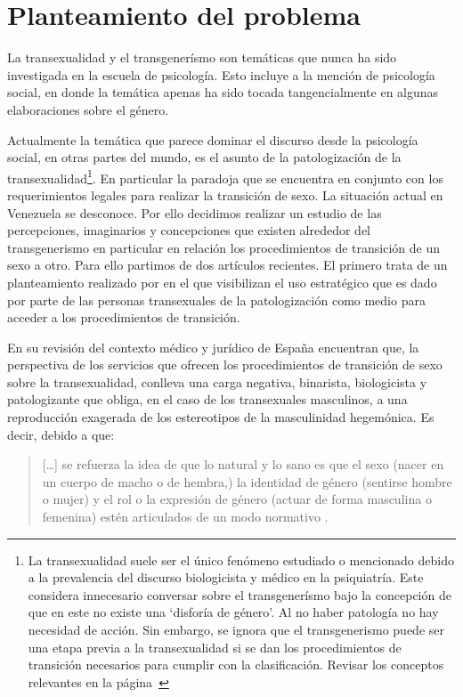 \section{Planteamiento del problema}

La transexualidad y el transgenerísmo son temáticas que nunca ha sido
investigada en la escuela de psicología. Esto incluye a la mención de psicología
social, en donde la temática apenas ha sido tocada tangencialmente en algunas
elaboraciones sobre el género.

Actualmente la temática que parece dominar el discurso desde la psicología
social, en otras partes del mundo, es el asunto de la patologización de la
transexualidad\footnote{La transexualidad suele ser el único fenómeno estudiado
o mencionado debido a la prevalencia del discurso biologicista y médico en la
psiquiatría. Este considera innecesario conversar sobre el transgenerísmo bajo
la concepción de que en este no existe una ‘disforía de género’. Al no haber
patología no hay necesidad de acción. Sin embargo, se ignora que el
transgenerismo puede ser una etapa previa a la transexualidad si se dan los
procedimientos de transición necesarios para cumplir con la clasificación.
Revisar los conceptos relevantes en la página~\pageref{diferencia}}. En
particular la paradoja que se encuentra en conjunto con los requerimientos
legales para realizar la transición de sexo. La situación actual en Venezuela se
desconoce. Por ello decidimos realizar un estudio de las percepciones,
imaginarios y concepciones que existen alrededor del transgenerismo en
particular en relación los procedimientos de transición de un sexo a otro.
Para ello partimos de dos artículos recientes. El primero trata de un
planteamiento realizado por \textcite{Coll-Planas2015} en el que visibilizan el
uso estratégico que es dado por parte de las personas transexuales de la
patologización como medio para acceder a los procedimientos de transición.

En su revisión del contexto médico y jurídico de España encuentran que, la
perspectiva de los servicios que ofrecen los procedimientos de transición de
sexo sobre la transexualidad, conlleva una carga negativa, binarista,
biologicista y patologizante que obliga, en el caso de los transexuales
masculinos, a una reproducción exagerada de los estereotipos de la masculinidad
hegemónica. Es decir, debido a que:

\begin{quote}
[…] se refuerza la idea de que lo natural y lo sano es que el sexo (nacer en un
cuerpo de macho o de hembra,) la identidad de género (sentirse hombre o
mujer) y el rol o la expresión de género (actuar de forma masculina o
femenina) estén articulados de un modo normativo \parencite[][p.
426]{Coll-Planas2015}.
\end{quote}

